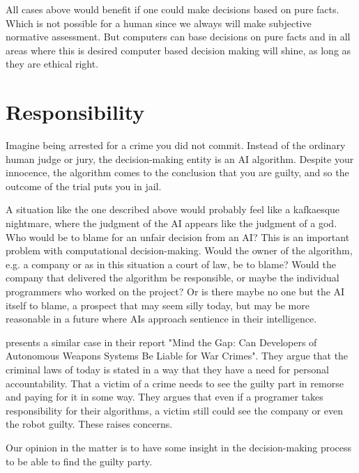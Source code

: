 \documentclass[11pt]{article}
\begin{document}
All cases above would benefit if one could make decisions based on pure facts. Which is not possible for a human
since we always will make subjective normative assessment. But computers can base decisions on pure facts and in all areas where this is desired computer based decision making will shine, as long as they are ethical right.

\section{Responsibility}
Imagine being arrested for a crime you did not commit.
Instead of the ordinary human judge or jury, the decision-making entity is an AI
algorithm. Despite your innocence, the algorithm comes to the conclusion that
you are guilty, and so the outcome of the trial puts you in jail.

A situation like the one described above would probably feel like a kafkaesque nightmare,
where the judgment of the AI appears like the judgment of a god. Who would be to
blame for an unfair decision from an AI? This is an important problem with
computational decision-making. Would the owner of the algorithm, e.g. a company
or as in this situation a court of law, be to blame? Would the company that
delivered the algorithm be responsible, or maybe the individual programmers who
worked on the project? Or is there maybe no one but the AI itself to blame, a
prospect that may seem silly today, but may be more reasonable in a future where
AIs approach sentience in their intelligence.

\citeauthor{mcfarland2014mind} presents a similar case in their report "Mind the Gap: Can Developers of Autonomous Weapons Systems Be Liable for War Crimes". They argue that the criminal laws of today is stated in a way that they have a need for personal accountability. That a victim of a crime needs to see the guilty part in remorse and paying for it in some way. They argues that even if a programer takes responsibility for their algorithms, a victim still could see the company or even the robot guilty. These raises concerns.

Our opinion in the matter is to have some insight in the decision-making process to be able to find the guilty party. 

\end{document}
